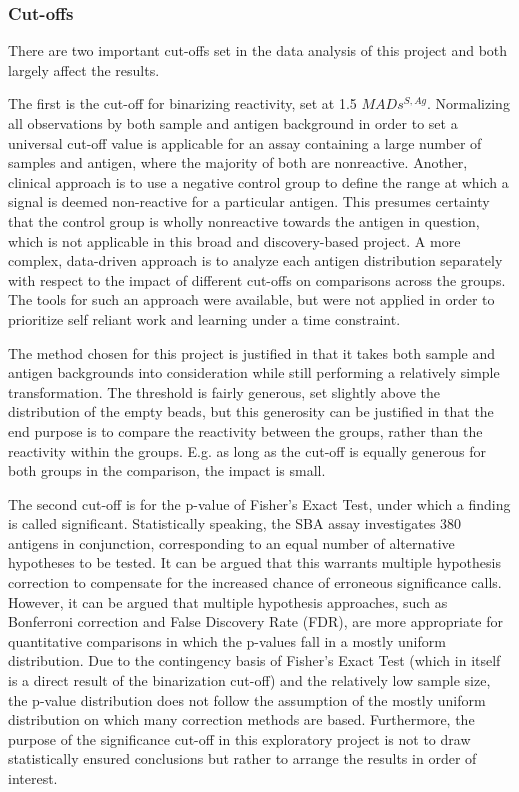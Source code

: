 \documentclass{article}
\begin{document}
\subsubsection{Cut-offs}
There are two important cut-offs set in the data analysis of this project and both largely affect the results.

The first is the cut-off for binarizing reactivity, set at 1.5 $MADs^{S,Ag}$. Normalizing all observations by both sample and antigen background in order to set a universal cut-off value is applicable for an assay containing a large number of samples and antigen, where the majority of both are nonreactive. Another, clinical approach is to use a negative control group to define the range at which a signal is deemed non-reactive for a particular antigen. This presumes certainty that the control group is wholly nonreactive towards the antigen in question, which is not applicable in this broad and discovery-based project. A more complex, data-driven approach is to analyze each antigen distribution separately with respect to the impact of different cut-offs on comparisons across the groups. The tools for such an approach were available, but were not applied in order to prioritize self reliant work and learning under a time constraint.

The method chosen for this project is justified in that it takes both sample and antigen backgrounds into consideration while still performing a relatively simple transformation. The threshold is fairly generous, set slightly above the distribution of the empty beads, but this generosity can be justified in that the end purpose is to compare the reactivity between the groups, rather than the reactivity within the groups. E.g. as long as the cut-off is equally generous for both groups in the comparison, the impact is small.

The second cut-off is for the p-value of Fisher's Exact Test, under which a finding is called significant. Statistically speaking, the SBA assay investigates 380 antigens in conjunction, corresponding to an equal number of alternative hypotheses to be tested. It can be argued that this warrants multiple hypothesis correction to compensate for the increased chance of erroneous significance calls. However, it can be argued that multiple hypothesis approaches, such as Bonferroni correction and False Discovery Rate (FDR), are more appropriate for quantitative comparisons in which the p-values fall in a mostly uniform distribution. Due to the contingency basis of Fisher's Exact Test (which in itself is a direct result of the binarization cut-off) and the relatively low sample size, the p-value distribution does not follow the assumption of the mostly uniform distribution on which many correction methods are based. Furthermore, the purpose of the significance cut-off in this exploratory project is not to draw statistically ensured conclusions but rather to arrange the results in order of interest.
\end{document}
